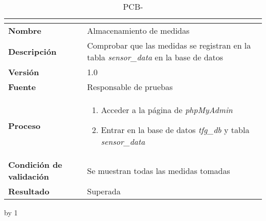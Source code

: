 \begin{table}[H]
	\caption{PCB-\number\pcb}
	\begin{tabular}{|l|p{}|}
		\hline
		\multicolumn{2}{|c|}{\cellcolor[HTML]{BFBFBF}{\color[HTML]{000000} \textbf{PCB-\number\pcb}}} \\ \hline
		\textbf{Nombre}                  & Almacenamiento de medidas                                                                    \\ \hline
		\textbf{Descripción}             & Comprobar que las medidas se registran en la tabla \textit{sensor\_data} en la base de datos \\ \hline
		\textbf{Versión}                 & 1.0                                                                                          \\ \hline
		\textbf{Fuente}                  & Responsable de pruebas                                                                       \\ \hline
		\textbf{Proceso}                 & \begin{enumerate}
			\item Acceder a la página de \textit{phpMyAdmin}
			\item Entrar en la base de datos \textit{tfg\_db} y tabla \textit{sensor\_data}
		\end{enumerate}                                                                    \\ \hline
		\textbf{Condición de validación} & Se muestran todas las medidas tomadas                                                        \\ \hline
		\textbf{Resultado}               & Superada                                                                                     \\ \hline
	\end{tabular}
\end{table}
\advance\pcb by 1
